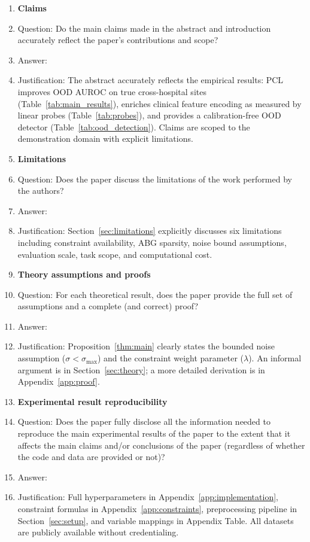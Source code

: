 \documentclass{article}
\begin{document}
\begin{enumerate}

\item {\bf Claims}
    \item[] Question: Do the main claims made in the abstract and introduction accurately reflect the paper's contributions and scope?
    \item[] Answer: \answerYes{}
    \item[] Justification: The abstract accurately reflects the empirical results: PCL improves OOD AUROC on true cross-hospital sites (Table~\ref{tab:main_results}), enriches clinical feature encoding as measured by linear probes (Table~\ref{tab:probes}), and provides a calibration-free OOD detector (Table~\ref{tab:ood_detection}). Claims are scoped to the demonstration domain with explicit limitations.

\item {\bf Limitations}
    \item[] Question: Does the paper discuss the limitations of the work performed by the authors?
    \item[] Answer: \answerYes{}
    \item[] Justification: Section~\ref{sec:limitations} explicitly discusses six limitations including constraint availability, ABG sparsity, noise bound assumptions, evaluation scale, task scope, and computational cost.

\item {\bf Theory assumptions and proofs}
    \item[] Question: For each theoretical result, does the paper provide the full set of assumptions and a complete (and correct) proof?
    \item[] Answer: \answerYes{}
    \item[] Justification: Proposition~\ref{thm:main} clearly states the bounded noise assumption ($\sigma < \sigma_{\max}$) and the constraint weight parameter ($\lambda$). An informal argument is in Section~\ref{sec:theory}; a more detailed derivation is in Appendix~\ref{app:proof}.

\item {\bf Experimental result reproducibility}
    \item[] Question: Does the paper fully disclose all the information needed to reproduce the main experimental results of the paper to the extent that it affects the main claims and/or conclusions of the paper (regardless of whether the code and data are provided or not)?
    \item[] Answer: \answerYes{}
    \item[] Justification: Full hyperparameters in Appendix~\ref{app:implementation}, constraint formulas in Appendix~\ref{app:constraints}, preprocessing pipeline in Section~\ref{sec:setup}, and variable mappings in Appendix Table. All datasets are publicly available without credentialing.


\end{enumerate}
\end{document}
